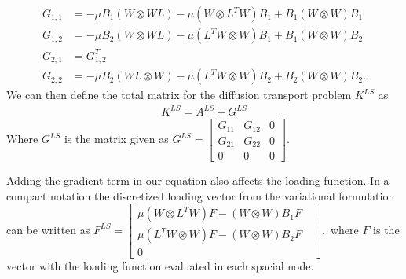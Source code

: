 \begin{align}
	G_{1,1} &= -\mu B_1 (W \otimes WL) -\mu( W \otimes L^TW) B_1 + B_1( W\otimes W) B_1 \\ 	
	G_{1,2} &= -\mu B_2 (W \otimes WL) -\mu (L^TW \otimes W) B_1 + B_1 (W\otimes W) B_2 \\
	G_{2,1} &= G_{1,2}^T \\
	G_{2,2} &= -\mu B_2 (WL \otimes W) -\mu (L^TW \otimes W) B_2 + B_2 (W\otimes W) B_2. 
	\label{eq:additionalMatrixDiffTrans}
\end{align}
%
We can then define the total matrix for the diffusion transport problem $K^{LS}$ as
\begin{align}
K^{LS} = A^{LS} + G^{LS}
	\label{eq:difftransMatrixSum}
\end{align}
Where $G^{LS}$ is the matrix given as 
$
G^{LS}=
\begin{bmatrix}
	G_{11} & G_{12} &0 \\
	G_{21} & G_{22} &0 \\
	0 & 0 & 0 
\end{bmatrix}.
$
%

Adding the gradient term in our equation also affects the loading function. In a compact notation the discretized loading vector from the variational formulation can be written as
$
F^{LS}=
\begin{bmatrix}
	\mu(W \otimes L^T W)F - (W \otimes W)B_1F \\
	\mu(L^TW \otimes W)F - (W \otimes W)B_2F \\
	0 & 
	\label{mat:FLS}
\end{bmatrix},
$
where $F$ is the vector with the loading function evaluated in each spacial node.
%
